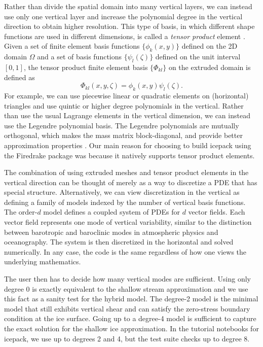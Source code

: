 \documentclass[journal abbreviation, manuscript]{copernicus}
\begin{document}
Rather than divide the spatial domain into many vertical layers, we can instead use only one vertical layer and increase the polynomial degree in the vertical direction to obtain higher resolution.
This type of basis, in which different shape functions are used in different dimensions, is called a \emph{tensor product} element \citep{mcrae2016automated}.
Given a set of finite element basis functions $\{\phi_k(x, y)\}$ defined on the 2D domain $\Omega$ and a set of basis functions $\{\psi_l(\zeta)\}$ defined on the unit interval $[0, 1]$, the tensor product finite element basis $\{\Phi_{kl}\}$ on the extruded domain is defined as
\begin{equation}
    \Phi_{kl}(x, y, \zeta) = \phi_k(x, y)\psi_l(\zeta).
\end{equation}
For example, we can use piecewise linear or quadratic elements on (horizontal) triangles and use quintic or higher degree polynomials in the vertical.
Rather than use the usual Lagrange elements in the vertical dimension, we can instead use the Legendre polynomial basis.
The Legendre polynomials are mutually orthogonal, which makes the mass matrix block-diagonal, and provide better approximation properties \citep{szabo2004p}.
Our main reason for choosing to build icepack using the Firedrake package was because it natively supports tensor product elements.

The combination of using extruded meshes and tensor product elements in the vertical direction can be thought of merely as a way to discretize a PDE that has special structure.
Alternatively, we can view discretization in the vertical as defining a family of models indexed by the number of vertical basis functions.
The order-$d$ model defines a coupled system of PDEs for $d$ vector fields.
Each vector field represents one mode of vertical variability, similar to the distinction between barotropic and baroclinic modes in atmospheric physics and oceanography.
The system is then discretized in the horizontal and solved numerically.
In any case, the code is the same regardless of how one views the underlying mathematics.

The user then has to decide how many vertical modes are sufficient.
Using only degree 0 is exactly equivalent to the shallow stream approximation and we use this fact as a sanity test for the hybrid model.
The degree-2 model is the minimal model that still exhibits vertical shear and can satisfy the zero-stress boundary condition at the ice surface.
Going up to a degree-4 model is sufficient to capture the exact solution for the shallow ice approximation.
In the tutorial notebooks for icepack, we use up to degrees 2 and 4, but the test suite checks up to degree 8.
\end{document}
